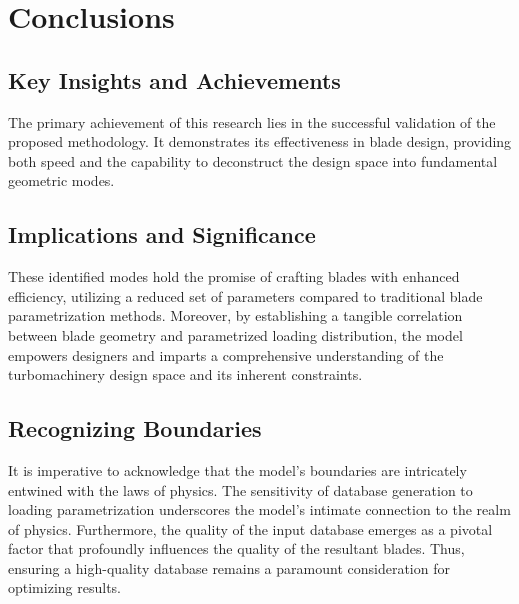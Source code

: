 \documentclass[11pt,a4paper,twocolumn]{article}
\begin{document}
\section{Conclusions}

\subsection{Key Insights and Achievements}

The primary achievement of this research lies in the successful validation of the proposed methodology. It demonstrates its effectiveness in blade design, providing both speed and the capability to deconstruct the design space into fundamental geometric modes.

\subsection{Implications and Significance}

These identified modes hold the promise of crafting blades with enhanced efficiency, utilizing a reduced set of parameters compared to traditional blade parametrization methods. Moreover, by establishing a tangible correlation between blade geometry and parametrized loading distribution, the model empowers designers and imparts a comprehensive understanding of the turbomachinery design space and its inherent constraints.

\subsection{Recognizing Boundaries}

It is imperative to acknowledge that the model's boundaries are intricately entwined with the laws of physics. The sensitivity of database generation to loading parametrization underscores the model's intimate connection to the realm of physics. Furthermore, the quality of the input database emerges as a pivotal factor that profoundly influences the quality of the resultant blades. Thus, ensuring a high-quality database remains a paramount consideration for optimizing results.
\end{document}

